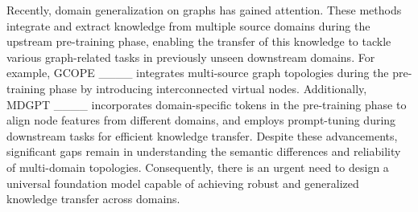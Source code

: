 Recently, domain generalization on graphs has gained attention. These methods integrate and extract knowledge from multiple source domains during the upstream pre-training phase, enabling the transfer of this knowledge to tackle various graph-related tasks in previously unseen downstream domains.
For example, GCOPE ____ integrates multi-source graph topologies during the pre-training phase by introducing interconnected virtual nodes. Additionally, MDGPT ____ incorporates domain-specific tokens in the pre-training phase to align node features from different domains, and employs prompt-tuning during downstream tasks for efficient knowledge transfer. Despite these advancements, significant gaps remain in understanding the semantic differences and reliability of multi-domain topologies. Consequently, there is an urgent need to design a universal foundation model capable of achieving robust and generalized knowledge transfer across domains.